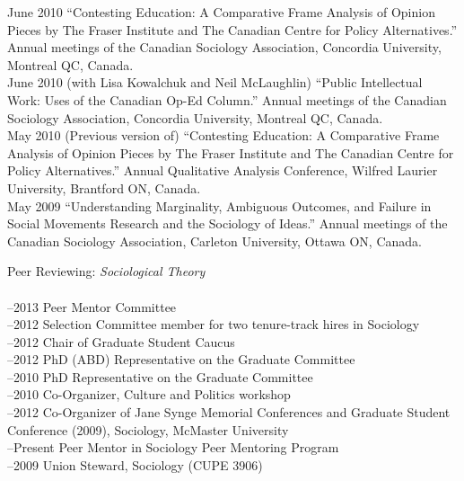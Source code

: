 \documentclass[11pt,usenames,dvipsnames]{article}
\begin{document}
\ind June 2010 ``Contesting Education: A Comparative Frame Analysis of Opinion Pieces by The Fraser Institute and The Canadian Centre for Policy Alternatives.'' Annual meetings  of the Canadian Sociology Association, Concordia University, Montreal QC, Canada.\\

\ind June 2010 (with Lisa Kowalchuk and Neil McLaughlin) ``Public Intellectual Work: Uses of the Canadian Op-Ed Column.'' Annual meetings of the Canadian Sociology Association, Concordia University, Montreal QC, Canada.\\

\ind May 2010 (Previous version of) ``Contesting Education: A Comparative Frame Analysis of Opinion Pieces by The Fraser Institute and The Canadian Centre for Policy Alternatives.'' Annual Qualitative Analysis Conference, Wilfred Laurier University, Brantford ON, Canada.\\

\ind May 2009 ``Understanding Marginality, Ambiguous Outcomes, and Failure in Social Movements Research and the Sociology of Ideas.'' Annual meetings of the Canadian Sociology Association, Carleton University, Ottawa ON, Canada.\\



\noindent Peer Reviewing: {\it Sociological Theory}\\

\\
–2013 Peer Mentor Committee\\
–2012 Selection Committee member for two tenure-track hires in Sociology\\
–2012 Chair of Graduate Student Caucus\\
–2012 PhD (ABD) Representative on the Graduate Committee\\
–2010 PhD Representative on the Graduate Committee\\
–2010 Co-Organizer, Culture and Politics workshop\\
–2012 Co-Organizer of Jane Synge Memorial Conferences and Graduate Student Conference (2009), Sociology, McMaster University\\
–Present Peer Mentor in Sociology Peer Mentoring Program\\
–2009 Union Steward, Sociology (CUPE 3906)\\
\end{document}
